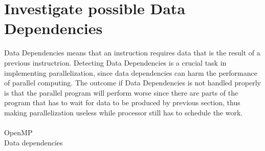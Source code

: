 \section{Investigate possible Data Dependencies}

Data Dependencies means that an instruction requires data that is the result of a previous instructrion. Detecting Data Dependencies is a crucial task in implementing parallelization, since data dependencies can harm the performance of parallel computing. The outcome if Data Dependencies is not handled properly is that the parallel program will perform worse since there are parts of the program that has to wait for data to be produced by previous section, thus making parallelization useless while processor still has to schedule the work. \\
~\\

OpenMP\\
Data dependencies\\
